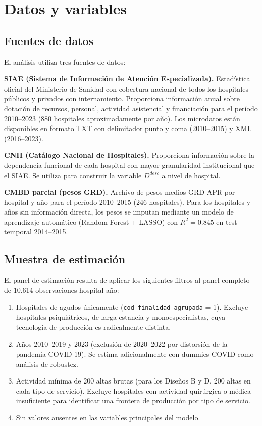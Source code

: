 \documentclass[12pt, a4paper]{article}
\begin{document}
\section{Datos y variables}

\subsection{Fuentes de datos}

El análisis utiliza tres fuentes de datos:

\textbf{SIAE (Sistema de Información de Atención
Especializada).} Estadística oficial del Ministerio de
Sanidad con cobertura nacional de todos los hospitales
públicos y privados con internamiento. Proporciona
información anual sobre dotación de recursos, personal,
actividad asistencial y financiación para el período
2010--2023 (880 hospitales aproximadamente por año).
Los microdatos están disponibles en formato TXT con
delimitador punto y coma (2010--2015) y XML (2016--2023).

\textbf{CNH (Catálogo Nacional de Hospitales).}
Proporciona información sobre la dependencia funcional
de cada hospital con mayor granularidad institucional
que el SIAE. Se utiliza para construir la variable
$D^{desc}$ a nivel de hospital.

\textbf{CMBD parcial (pesos GRD).} Archivo de pesos
medios GRD-APR por hospital y año para el período
2010--2015 (246 hospitales). Para los hospitales y
años sin información directa, los pesos se imputan
mediante un modelo de aprendizaje automático
(Random Forest + LASSO) con $R^2 = 0.845$ en test
temporal 2014--2015.

\subsection{Muestra de estimación}

El panel de estimación resulta de aplicar los siguientes
filtros al panel completo de 10.614 observaciones
hospital-año:

\begin{enumerate}
  \item Hospitales de agudos únicamente
    (\texttt{cod\_finalidad\_agrupada} = 1). Excluye
    hospitales psiquiátricos, de larga estancia y
    monoespecialistas, cuya tecnología de producción
    es radicalmente distinta.
  \item Años 2010--2019 y 2023 (exclusión de 2020--2022
    por distorsión de la pandemia COVID-19). Se estima
    adicionalmente con dummies COVID como análisis de
    robustez.
  \item Actividad mínima de 200 altas brutas (para los
    Diseños B y D, 200 altas en cada tipo de servicio).
    Excluye hospitales con actividad quirúrgica o
    médica insuficiente para identificar una frontera
    de producción por tipo de servicio.
  \item Sin valores ausentes en las variables principales
    del modelo.
\end{enumerate}
\end{document}
